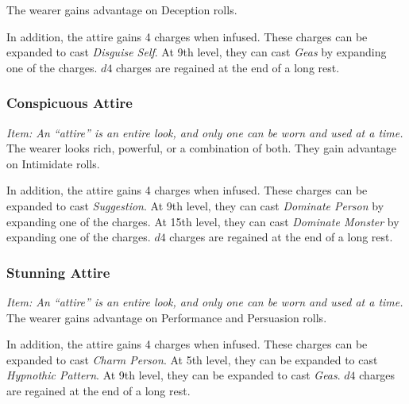 \documentclass[twocolumn]{dndbook}
\begin{document}
The wearer gains advantage on Deception rolls.\par

In addition, the attire gains 4 charges when infused.
These charges can be expanded to cast \emph{Disguise Self}.
At 9th level, they can cast \emph{Geas} by expanding one of the charges.
$d4$ charges are regained at the end of a long rest.

\subsubsection{Conspicuous Attire}
\emph{Item: An ``attire'' is an entire look, and only one can be worn and used at a time.}
The wearer looks rich, powerful, or a combination of both.
They gain advantage on Intimidate rolls.\par

In addition, the attire gains 4 charges when infused.
These charges can be expanded to cast \emph{Suggestion}.
At 9th level, they can cast \emph{Dominate Person} by expanding one of the charges.
At 15th level, they can cast \emph{Dominate Monster} by expanding one of the charges.
$d4$ charges are regained at the end of a long rest.

\subsubsection{Stunning Attire}
\emph{Item: An ``attire'' is an entire look, and only one can be worn and used at a time.}
The wearer gains advantage on Performance and Persuasion rolls.

In addition, the attire gains 4 charges when infused.
These charges can be expanded to cast \emph{Charm Person}.
At 5th level, they can be expanded to cast \emph{Hypnothic Pattern}.
At 9th level, they can be expanded to cast \emph{Geas}.
$d4$ charges are regained at the end of a long rest.
\end{document}
